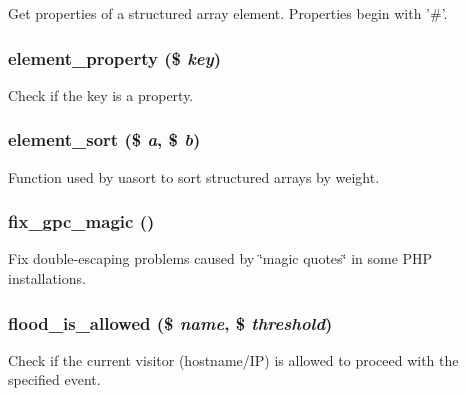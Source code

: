 Get properties of a structured array element. Properties begin with '\#'. \hypertarget{common_8inc_7a93c74e138f24e5f7e672972644f1c3}{
\subsubsection[{element\_\-property}]{\setlength{\rightskip}{0pt plus 5cm}element\_\-property (\$ {\em key})}}
\label{common_8inc_7a93c74e138f24e5f7e672972644f1c3}


Check if the key is a property. \hypertarget{common_8inc_61f0cc62072ab44aa349478fb7219c74}{
\subsubsection[{element\_\-sort}]{\setlength{\rightskip}{0pt plus 5cm}element\_\-sort (\$ {\em a}, \/  \$ {\em b})}}
\label{common_8inc_61f0cc62072ab44aa349478fb7219c74}


Function used by uasort to sort structured arrays by weight. \hypertarget{common_8inc_befb935bf3c61840ba9ad50adb13f766}{
\subsubsection[{fix\_\-gpc\_\-magic}]{\setlength{\rightskip}{0pt plus 5cm}fix\_\-gpc\_\-magic ()}}
\label{common_8inc_befb935bf3c61840ba9ad50adb13f766}


Fix double-escaping problems caused by \char`\"{}magic quotes\char`\"{} in some PHP installations. \hypertarget{common_8inc_d2296ecb4750af9f666f72ec7ee3cae5}{
\subsubsection[{flood\_\-is\_\-allowed}]{\setlength{\rightskip}{0pt plus 5cm}flood\_\-is\_\-allowed (\$ {\em name}, \/  \$ {\em threshold})}}
\label{common_8inc_d2296ecb4750af9f666f72ec7ee3cae5}


Check if the current visitor (hostname/IP) is allowed to proceed with the specified event.

